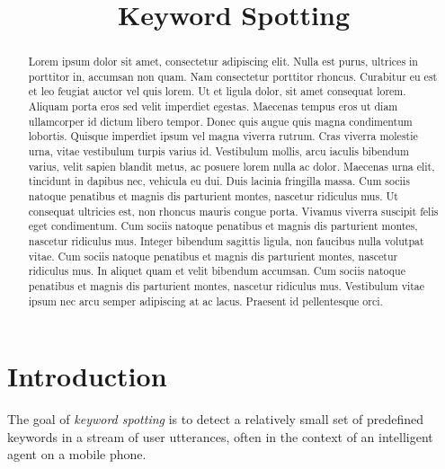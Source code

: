 \documentclass[conference]{IEEEtran}
\begin{document}
\title{Keyword Spotting}
\author{
\and
{}
}

\maketitle

\begin{abstract}
Lorem ipsum dolor sit amet, consectetur adipiscing elit. Nulla est purus, ultrices in porttitor
in, accumsan non quam. Nam consectetur porttitor rhoncus. Curabitur eu est et leo feugiat
auctor vel quis lorem. Ut et ligula dolor, sit amet consequat lorem. Aliquam porta eros sed
velit imperdiet egestas. Maecenas tempus eros ut diam ullamcorper id dictum libero
tempor. Donec quis augue quis magna condimentum lobortis. Quisque imperdiet ipsum vel
magna viverra rutrum. Cras viverra molestie urna, vitae vestibulum turpis varius id.
Vestibulum mollis, arcu iaculis bibendum varius, velit sapien blandit metus, ac posuere lorem
nulla ac dolor. Maecenas urna elit, tincidunt in dapibus nec, vehicula eu dui. Duis lacinia
fringilla massa. Cum sociis natoque penatibus et magnis dis parturient montes, nascetur
ridiculus mus. Ut consequat ultricies est, non rhoncus mauris congue porta. Vivamus viverra
suscipit felis eget condimentum. Cum sociis natoque penatibus et magnis dis parturient
montes, nascetur ridiculus mus. Integer bibendum sagittis ligula, non faucibus nulla volutpat
vitae. Cum sociis natoque penatibus et magnis dis parturient montes, nascetur ridiculus mus.  
In aliquet quam et velit bibendum accumsan. Cum sociis natoque penatibus et magnis dis
parturient montes, nascetur ridiculus mus. Vestibulum vitae ipsum nec arcu semper
adipiscing at ac lacus. Praesent id pellentesque orci.
\end{abstract}

\IEEEpeerreviewmaketitle

\section{Introduction}
The goal of \textit{keyword spotting} is to detect a relatively small set of predefined keywords in a stream of user utterances, often in the context of an intelligent agent on a mobile phone. 
\end{document}

